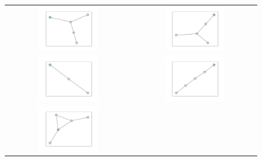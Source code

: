 \documentclass[12pt, a4paper]{extarticle}
\begin{document}
\begin{figure}\centering\begin{tabularx}{\textwidth}{cc}
\includegraphics[width=0.5\textwidth]{task11-graphlets/5_14-16-25-23-26.pdf} &
\includegraphics[width=0.5\textwidth]{task11-graphlets/5_14-16-17-25-23.pdf} \\
\includegraphics[width=0.5\textwidth]{task11-graphlets/3_14-21-23.pdf} &
\includegraphics[width=0.5\textwidth]{task11-graphlets/5_14-13-15-21-23.pdf} \\
\includegraphics[width=0.5\textwidth]{task11-graphlets/5_21-18-25-20-23.pdf} &

\end{tabularx}
\end{figure}
\end{document}
